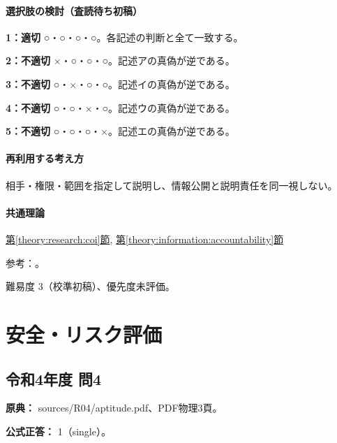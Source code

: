 \paragraph{選択肢の検討（査読待ち初稿）}\mbox{}\par

\noindent\textbf{1：適切} ○・○・○・○。各記述の判断と全て一致する。\par

\noindent\textbf{2：不適切} ×・○・○・○。記述アの真偽が逆である。\par

\noindent\textbf{3：不適切} ○・×・○・○。記述イの真偽が逆である。\par

\noindent\textbf{4：不適切} ○・○・×・○。記述ウの真偽が逆である。\par

\noindent\textbf{5：不適切} ○・○・○・×。記述エの真偽が逆である。\par

\paragraph{再利用する考え方} 相手・権限・範囲を指定して説明し、情報公開と説明責任を同一視しない。

\paragraph{共通理論} \hyperref[theory:research:coi]{第\ref*{theory:research:coi}節}, \hyperref[theory:information:accountability]{第\ref*{theory:information:accountability}節}

\par 参考：\cite{singapore2010,scj_code2013}。

\par 難易度 3（校準初稿）、優先度未評価。

\section{安全・リスク評価}

\subsection{令和4年度 問4}
\label{q:r04-reg-apt-04}

\noindent\textbf{原典：} sources/R04/aptitude.pdf、PDF物理3頁。

\textbf{公式正答：} 1（single）。

